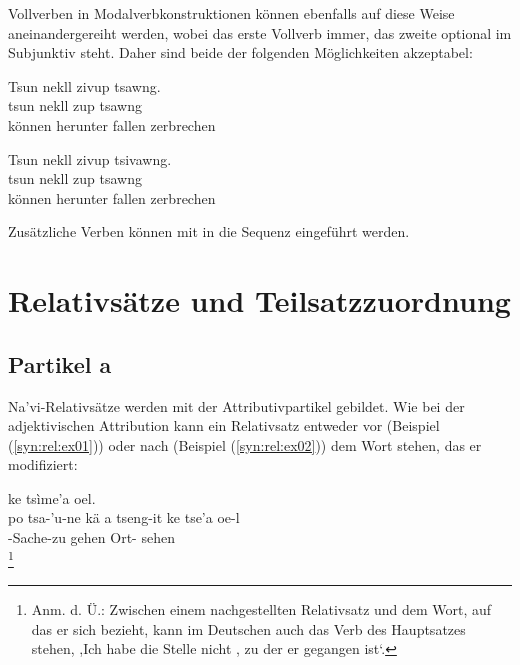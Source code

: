 \noindent Vollverben in Modalverbkonstruktionen können ebenfalls auf diese Weise aneinandergereiht werden, wobei das erste Vollverb immer, das zweite optional im Subjunktiv steht. Daher sind beide der folgenden Möglichkeiten akzeptabel:

\begin{interlin}
	\glll \Npawl{}Tsun nekll zivup tsawng. \\
	tsun nekll zup tsawng \\
	können herunter fallen zerbrechen \\
\end{interlin}

\begin{interlin}
	\glll \Npawl{}Tsun nekll zivup tsivawng. \\
	tsun nekll zup tsawng \\
	können herunter fallen zerbrechen \\
\end{interlin}

\noindent Zusätzliche Verben können mit  in die Sequenz eingeführt werden. 

\section{Relativsätze und Teilsatzzuordnung}
\subsection{Partikel a} Na'vi-Relativsätze werden mit der Attributivpartikel  gebildet.\label{syn:a} Wie bei der adjektivischen Attribution kann ein Relativsatz entweder vor (Beispiel (\ref{syn:rel:ex01})) oder nach (Beispiel (\ref{syn:rel:ex02})) dem Wort stehen, das er modifiziert:

\begin{interlin} \label{syn:rel:ex01}
	\glll \Npawl{}     ke tsìme'a oel. \\
	po tsa-'u-ne kä a tseng-it ke tse'a oe-l \\
	 -Sache-zu gehen  Ort-  sehen  \\
	\footnote{\normalfont Anm. d. Ü.: Zwischen einem nachgestellten Relativsatz und dem Wort, auf das er sich bezieht, kann im Deutschen auch das Verb des Hauptsatzes stehen, ,Ich habe die Stelle nicht , zu der er gegangen ist‘.}
\end{interlin}

